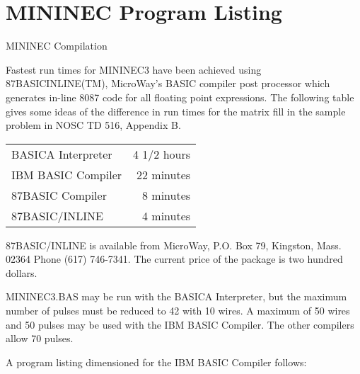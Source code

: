 \documentclass[12pt]{article}
\begin{document}
\section{MININEC Program Listing}
MININEC Compilation

\newcommand{\slashbreak}{\discretionary{/}{}{/}}
Fastest run times for MININEC3 have been achieved using
87BASIC\slashbreak{}INLINE(TM), MicroWay's BASIC compiler post processor
which generates in-line 8087 code for all floating point expressions.
The following table gives some ideas of the difference in run times for
the matrix fill in the sample problem in NOSC TD 516, Appendix B.

\begin{table}[h]
\begin{tabular}{lr}
BASICA Interpreter & 4 1/2 hours \\
IBM BASIC Compiler & 22 minutes  \\
87BASIC Compiler   &  8 minutes  \\
87BASIC/INLINE     &  4 minutes  \\
\end{tabular}
\end{table}

87BASIC/INLINE is available from MicroWay, P.O. Box 79, Kingston, Mass.
02364 Phone (617) 746-7341. The current price of the package is two
hundred dollars.

MININEC3.BAS may be run with the BASICA Interpreter, but the maximum
number of pulses must be reduced to 42 with 10 wires. A maximum of 50
wires and 50 pulses may be used with the IBM BASIC Compiler. The other
compilers allow 70 pulses.

A program listing dimensioned for the IBM BASIC Compiler follows:


\end{document}
